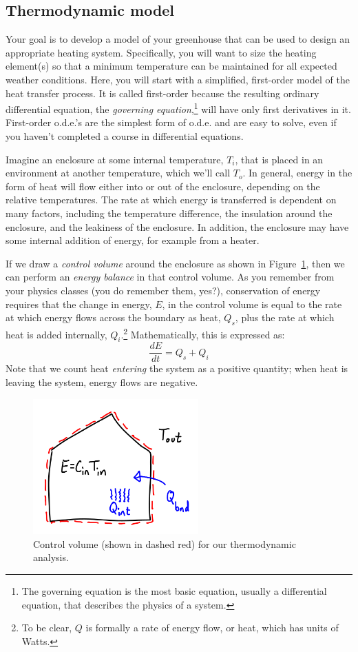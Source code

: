 \documentclass[11pt]{article} %
\begin{document}
\subsection{Thermodynamic model}

Your goal is to develop a model of your greenhouse that can be used to design an appropriate heating system. Specifically, you will want to size the heating element(s) so that a minimum temperature can be maintained for all expected weather conditions. Here, you will start with a simplified, first-order model of the heat transfer process. It is called first-order because the resulting ordinary differential equation, the \emph{governing equation},\footnote{The governing equation is the most basic equation, usually a differential equation, that describes the physics of a system.} will have only first derivatives in it. First-order o.d.e.'s are the simplest form of o.d.e. and are easy to solve, even if you haven't completed a course in differential equations.

Imagine an enclosure at some internal temperature, $T_{i}$, that is placed in an environment at another temperature, which we'll call $T_{o}$. In general, energy in the form of heat will flow either into or out of the enclosure, depending on the relative temperatures. The rate at which energy is transferred is dependent on many factors, including the temperature difference, the insulation around the enclosure, and the leakiness of the enclosure. In addition, the enclosure may have some internal addition of energy, for example from a heater.

If we draw a \emph{control volume} around the enclosure as shown in Figure~\ref{fig:control.volume}, then we can perform an \emph{energy balance} in that control volume. As you remember from your physics classes (you do remember them, yes?), conservation of energy requires that the change in energy, $E$, in the control volume is equal to the rate at which energy flows across the boundary as heat, $Q_{s}$, plus the rate at which heat is added internally, $Q_{i}$.\footnote{To be clear, $Q$ is formally a rate of energy flow, or heat, which has units of Watts.} Mathematically, this is expressed as:
\[
\frac{dE}{dt} = Q_{s} + Q_{i}
\] 
%
Note that we count heat \emph{entering} the system as a positive quantity; when heat is leaving the system, energy flows are negative.

\begin{figure}
\centering
\includegraphics[width=2.5in ]{figures/control_volume.png}
\caption{Control volume (shown in dashed red) for our thermodynamic analysis.}
\label{fig:control.volume}
\end{figure}
\end{document}
